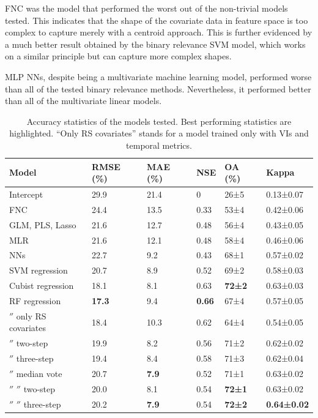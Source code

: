 \documentclass[review,authoryear,3p]{elsarticle}
\begin{document}
\Gls{FNC} was the model that performed the worst out of the non-trivial models tested.
This indicates that the shape of the covariate data in feature space is too complex to capture merely with a centroid approach.
This is further evidenced by a much better result obtained by the binary relevance \gls{SVM} model, which works on a similar principle but can capture more complex shapes.

\Gls{MLP} \glspl{NN}, despite being a multivariate machine learning model, performed worse than all of the tested binary relevance methods.
Nevertheless, it performed better than all of the multivariate linear models.

\begin{table}
\centering
\begin{tabular}{llllll}
\toprule
\textbf{Model} & \textbf{\ac{RMSE} (\%)} & \textbf{\ac{MAE} (\%)} & \textbf{\acrshort{NSE}} & \textbf{\ac{OA} (\%)} & \textbf{Kappa} \\
\midrule
Intercept
& 29.9  & 21.4  & 0     & 26±5  & 0.13±0.07 \\
\Gls{FNC}
& 24.4  & 13.5  & 0.33  & 53±4  & 0.42±0.06 \\
\Gls{GLM}, \Gls{PLS}, Lasso
& 21.6  & 12.7  & 0.48  & 56±4  & 0.43±0.05 \\
\Gls{MLR}
& 21.6  & 12.1  & 0.48  & 58±4  & 0.46±0.06 \\
\Glspl{NN}
& 22.7  & 9.2   & 0.43  & 68±1  & 0.57±0.02 \\
\Gls{SVM} regression
& 20.7  & 8.9   & 0.52  & 69±2  & 0.58±0.03 \\
Cubist regression
& 18.1  & 8.1   & 0.63  & \textbf{72±2}  & 0.63±0.03 \\
\Gls{RF} regression
& \textbf{17.3}  & 9.4   & \textbf{0.66}  & 67±4  & 0.57±0.05 \\
\ensuremath{''}
only RS covariates
& 18.4  & 10.3  & 0.62  & 64±4  & 0.54±0.05 \\
\ensuremath{''} two-step
& 19.9  & 8.2   & 0.56  & 71±2  & 0.62±0.02 \\
\ensuremath{''} three-step
& 19.4  & 8.4   & 0.58  & 71±3  & 0.62±0.04 \\
\ensuremath{''} median vote
& 20.7  & \textbf{7.9}   & 0.52  & 71±1  & 0.63±0.02 \\
\ensuremath{''} \ensuremath{''} two-step
& 20.0  & 8.1   & 0.54  & \textbf{72±1}  & 0.63±0.02 \\
\ensuremath{''} \ensuremath{''} three-step
& 20.2  & \textbf{7.9}   & 0.54  & \textbf{72±2}  & \textbf{0.64±0.02} \\
\bottomrule
\end{tabular}
\caption{Accuracy statistics of the models tested. Best performing statistics are highlighted. ``Only RS covariates'' stands for a model trained only with \glspl{VI} and temporal metrics.}
\label{tab-accuracy}
\end{table}
\end{document}
